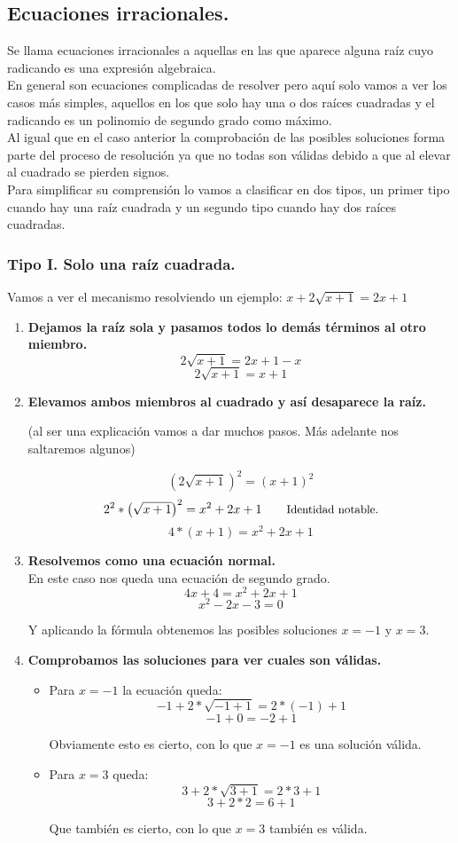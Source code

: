 \documentclass[a4paper,11pt,answers]{exam}
\begin{document}
\subsection{Ecuaciones irracionales.}
Se llama ecuaciones irracionales a aquellas en las que aparece alguna raíz cuyo radicando es una expresión algebraica.\\

En general son ecuaciones complicadas de resolver pero aquí solo vamos a ver los casos más simples,
aquellos en los que solo hay una o dos raíces cuadradas y el radicando es un polinomio de segundo
grado como máximo.\\
Al igual que en el caso anterior la comprobación de las posibles soluciones forma parte del
proceso de resolución ya que no todas son válidas debido a que al elevar al cuadrado se pierden
signos.\\

Para simplificar su comprensión lo vamos a clasificar en dos tipos, un primer tipo cuando hay una raíz cuadrada y un segundo tipo cuando hay dos raíces cuadradas.
\subsubsection{Tipo I. Solo una raíz cuadrada.}
Vamos a ver el mecanismo resolviendo un ejemplo: $x+2\sqrt{x+1} = 2x + 1$
\begin{enumerate}
\item \textbf{Dejamos la raíz sola y pasamos todos lo demás términos al otro miembro.}
  \[2\sqrt{x+1} = 2x + 1 - x\]
  \[2\sqrt{x+1} = x + 1\]
\item \textbf{Elevamos ambos miembros al cuadrado y así desaparece la raíz.}
  \begin{center}
    \small{(al ser una explicación vamos a dar muchos pasos. Más adelante nos saltaremos algunos)}
  \end{center}
  \[\left( 2\sqrt{x+1} \right)^2 = (x+1)^2\]
  \[2^2 * \left(\sqrt{x+1}\right)^2 = x^2 + 2x + 1\quad\quad\text{\small{Identidad notable.}}\]
  \[4*(x+1) = x^2 + 2x + 1\]
\item \textbf{Resolvemos como una ecuación normal.}\\
  En este caso nos queda una ecuación de segundo grado.
  \[4x + 4 = x^2 + 2x +1\]
  \[x^2 -2x -3 = 0\]
  
  Y aplicando la fórmula obtenemos las posibles soluciones $x= -1$ y $x= 3$.
\item \textbf{Comprobamos las soluciones para ver cuales son válidas.}\\
  \begin{itemize}
  \item Para $x = -1$ la ecuación queda:
    \[-1 + 2*\sqrt{-1 + 1} = 2*(-1) + 1\]
    \[-1 + 0 = -2 + 1\]

    Obviamente esto es cierto, con lo que $x= -1$ es una solución válida.
  \item Para $x = 3$ queda:
    \[3 + 2*\sqrt{3+1} = 2*3 + 1\]
    \[3 + 2*2 = 6 + 1\]

    Que también es cierto, con lo que $x = 3$ también es válida.
  \end{itemize}
\end{enumerate}
\end{document}
